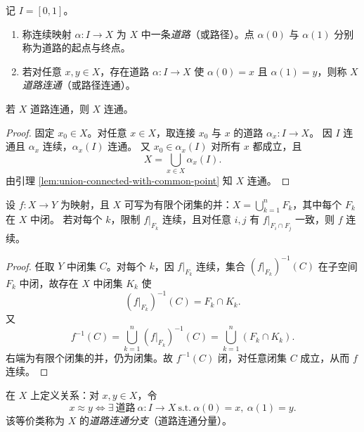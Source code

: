 \documentclass[lang=cn,a4paper,newtx,figureplace=section,tableplace=section]{elegantbook}
\begin{document}
\begin{definition}[道路与道路连通]\label{def:path-path-connected}
  记 $I=[0,1]$。
  \begin{enumerate}
    \item 称连续映射 $\alpha:I\to X$ 为 $X$ 中一条\emph{道路}（或路径）。点 $\alpha(0)$ 与 $\alpha(1)$ 分别称为道路的起点与终点。
    \item 若对任意 $x,y\in X$，存在道路 $\alpha:I\to X$ 使 $\alpha(0)=x$ 且 $\alpha(1)=y$，则称 $X$ \emph{道路连通}（或路径连通）。
  \end{enumerate}
\end{definition}

\begin{proposition}\label{prop:path-connected-implies-connected}
  若 $X$ 道路连通，则 $X$ 连通。
\end{proposition}
\begin{proof}
  固定 $x_0\in X$。对任意 $x\in X$，取连接 $x_0$ 与 $x$ 的道路 $\alpha_x:I\to X$。
  因 $I$ 连通且 $\alpha_x$ 连续，$\alpha_x(I)$ 连通。
  又 $x_0\in\alpha_x(I)$ 对所有 $x$ 都成立，且
  \[
    X=\bigcup_{x\in X}\alpha_x(I).
  \]
  由引理 \ref{lem:union-connected-with-common-point} 知 $X$ 连通。
\end{proof}

\begin{lemma}\label{lem:gluing-closed}
  设 $f:X\to Y$ 为映射，且 $X$ 可写为有限个闭集的并：$X=\bigcup_{k=1}^{n}F_k$，其中每个 $F_k$ 在 $X$ 中闭。
  若对每个 $k$，限制 $f|_{F_k}$ 连续，且对任意 $i,j$ 有 $f|_{F_i\cap F_j}$ 一致，则 $f$ 连续。
\end{lemma}
\begin{proof}
  任取 $Y$ 中闭集 $C$。对每个 $k$，因 $f|_{F_k}$ 连续，集合 $(f|_{F_k})^{-1}(C)$ 在子空间 $F_k$ 中闭，故存在 $X$ 中闭集 $K_k$ 使
  \[
    (f|_{F_k})^{-1}(C)=F_k\cap K_k.
  \]
  又
  \[
    f^{-1}(C)=\bigcup_{k=1}^{n}(f|_{F_k})^{-1}(C)=\bigcup_{k=1}^{n}(F_k\cap K_k).
  \]
  右端为有限个闭集的并，仍为闭集。故 $f^{-1}(C)$ 闭，对任意闭集 $C$ 成立，从而 $f$ 连续。
\end{proof}

\begin{definition}[道路连通分支]\label{def:path-component}
  在 $X$ 上定义关系：对 $x,y\in X$，令
  \[
    x\approx y\iff \exists\ \text{道路}\ \alpha:I\to X\ \text{s.t.}\ \alpha(0)=x,\ \alpha(1)=y.
  \]
  该等价类称为 $X$ 的\emph{道路连通分支}（道路连通分量）。
\end{definition}
\end{document}
